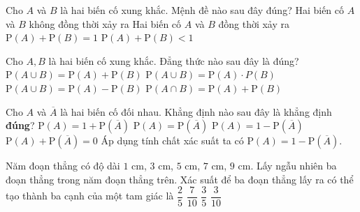 \begin{ex}%
	Cho $A$ và $B$ là hai biến cố xung khắc. Mệnh đề nào sau đây đúng?
	\choice
	{\True Hai biến cố $A$ và $B$ không đồng thời xảy ra}
	{Hai biến cố $A$ và $B$ đồng thời xảy ra}
	{$\mathrm{P}(A) + \mathrm{P}(B) = 1$}
	{$\mathrm{P}(A) + \mathrm{P}(B) < 1$}
\end{ex}%
\begin{ex}%
	Cho $A,B$ là hai biến cố xung khắc. Đẳng thức nào sau đây là đúng?
	\choice
	{\True $\mathrm{P}(A\cup B) = \mathrm{P}(A)+\mathrm{P}(B)$}
	{$\mathrm{P}(A \cup B) = \mathrm{P}(A)\cdot P(B)$}
	{$\mathrm{P}(A\cup B) = \mathrm{P}(A)-\mathrm{P}(B)$}
	{$\mathrm{P}(A\cap B) = \mathrm{P}(A)+\mathrm{P}(B)$}
\end{ex}%
\begin{ex}%
	Cho $A$ và $\overline{A}$ là hai biến cố đối nhau. Khẳng định nào sau đây là khẳng định \textbf{đúng}?
	\choice
	{$\mathrm{P}(A)=1+\mathrm{P}(\overline{A})$}
	{$\mathrm{P}(A)=\mathrm{P}(\overline{A})$}
	{\True $\mathrm{P}(A)=1-\mathrm{P}(\overline{A})$}
	{$\mathrm{P}(A)+\mathrm{P}(\overline{A})=0$}
	\loigiai
	{Áp dụng tính chất xác suất ta có $\mathrm{P}(A)=1-\mathrm{P}(\overline{A})$.}
\end{ex}%
\begin{ex}%
	Năm đoạn thẳng có độ dài $1$ cm, $3$ cm, $5$ cm, $7$ cm, $9$ cm. Lấy ngẫu nhiên ba đoạn thẳng trong năm đoạn thẳng trên. Xác suất để ba đoạn thẳng lấy ra có thể tạo thành ba cạnh của một tam giác là
	\choice
	{$\dfrac{2}{5}$}
	{$\dfrac{7}{10}$}
	{$\dfrac{3}{5}$}
	{\True $\dfrac{3}{10}$}
\end{ex}